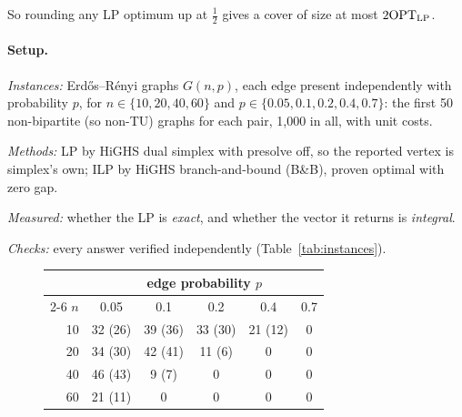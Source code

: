So rounding any LP optimum up at $\tfrac12$ gives a cover of size at most $2\mathrm{OPT}_{\mathrm{LP}}$.

\paragraph{Setup.}
\begin{setup}
  \item \emph{Instances:} Erd\H{o}s--Rényi graphs $G(n,p)$, each edge present independently with probability $p$, for $n\in\{10,20,40,60\}$ and $p\in\{0.05,0.1,0.2,0.4,0.7\}$: the first 50 non-bipartite (so non-TU) graphs for each pair, 1,000 in all, with unit costs.
  \item \emph{Methods:} LP by HiGHS dual simplex \cite{huangfu2018} with presolve off, so the reported vertex is simplex's own; ILP by HiGHS branch-and-bound (B\&B), proven optimal with zero gap.
  \item \emph{Measured:} whether the LP is \emph{exact}, and whether the vector it returns is \emph{integral}.
  \item \emph{Checks:} every answer verified independently (Table~\ref{tab:instances}).
\end{setup}

\begin{figure}[H]
  \begin{minipage}[b]{0.40\textwidth}\centering
    
    \label{fig:diag}
  \end{minipage}\hfill
  \begin{minipage}[b]{0.56\textwidth}\centering\small
    \label{tab:e1}
    \begin{tabular}{@{}r*{5}{c}@{}}
      \toprule
      & \multicolumn{5}{c}{edge probability $p$} \\
      \cmidrule(l){2-6}
      $n$ & 0.05 & 0.1 & 0.2 & 0.4 & 0.7 \\
      \midrule
      10 & 32 (26) & 39 (36) & 33 (30) & 21 (12) & 0 \\
      20 & 34 (30) & 42 (41) & 11 \phantom{0}(6) & 0 & 0 \\
      40 & 46 (43) & \phantom{0}9 \phantom{0}(7) & 0 & 0 & 0 \\
      60 & 21 (11) & 0 & 0 & 0 & 0 \\
      \bottomrule
    \end{tabular}
  \end{minipage}
\end{figure}

